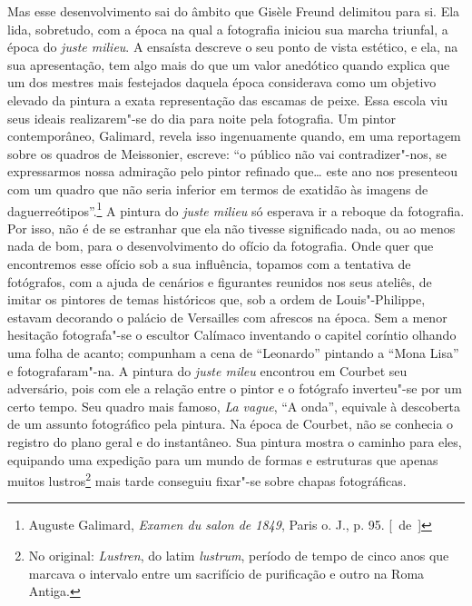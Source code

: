 Mas esse desenvolvimento sai do âmbito que Gisèle Freund delimitou
para si. Ela lida, sobretudo, com a época na qual a fotografia iniciou
sua marcha triunfal, a época do \emph{juste milieu}. A ensaísta
descreve o seu ponto de vista estético, e ela, na sua apresentação, tem algo mais do que um valor anedótico quando explica que
um dos mestres mais festejados daquela época considerava como um objetivo
elevado da pintura a exata representação das escamas de peixe. Essa
escola viu seus ideais realizarem"-se do dia para noite pela fotografia.
Um pintor contemporâneo, Galimard, revela isso ingenuamente quando, em
uma reportagem sobre os quadros de Meissonier, escreve: ``o público não
vai contradizer"-nos, se expressarmos nossa admiração pelo pintor
refinado que\ldots{} este ano nos presenteou com um quadro que não seria
inferior em termos de exatidão às imagens de daguerreótipos''.\footnote{Auguste Galimard,
  \emph{Examen du salon de 1849}, Paris o. J., p. 95. [~de~]} A pintura
do \emph{juste milieu} só esperava ir a reboque da
fotografia. Por isso, não é de se estranhar que ela não tivesse
significado nada, ou ao menos nada de bom, para o desenvolvimento do
ofício da fotografia. Onde quer que encontremos esse ofício sob a sua
influência, topamos com a tentativa de fotógrafos, com a ajuda de
cenários e figurantes reunidos nos seus ateliês, de imitar os
pintores de temas históricos que, sob a ordem de Louis"-Philippe, estavam decorando
o palácio de Versailles com afrescos na época. Sem a menor hesitação fotografa"-se o
escultor Calímaco inventando o capitel coríntio olhando
uma folha de acanto; compunham a cena de ``Leonardo'' pintando a ``Mona
Lisa'' e fotografaram"-na. A pintura do \emph{juste mileu} encontrou em
Courbet seu adversário, pois com ele a relação entre o pintor e o fotógrafo
inverteu"-se por um certo tempo. Seu quadro mais famoso, \emph{La vague},
``A onda'', equivale à descoberta de um assunto fotográfico pela
pintura. Na época de Courbet, não se conhecia o registro do plano geral
e do instantâneo. Sua pintura mostra o caminho para eles, equipando uma
expedição para um mundo de formas e estruturas que apenas muitos
lustros\footnote{No original: \emph{Lustren}, do latim \emph{lustrum},
  período de tempo de cinco anos que marcava o intervalo entre um
  sacrifício de purificação e outro na Roma Antiga. \versal{[N.~T.]}} mais tarde
conseguiu fixar"-se sobre chapas fotográficas.

